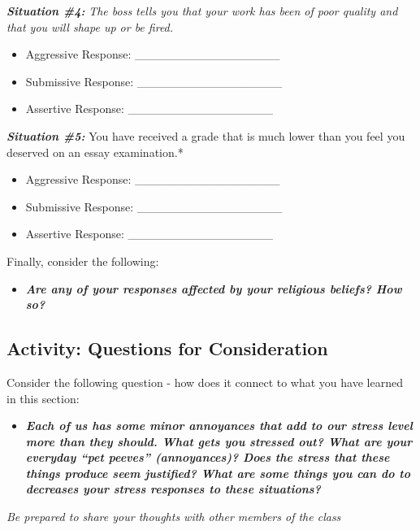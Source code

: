 \documentclass[
]{book}
\providecommand{\tightlist}{%
  \setlength{\itemsep}{0pt}\setlength{\parskip}{0pt}}
\begin{document}
\begin{reflect}
\textbf{\emph{Situation \#4:}} \emph{The boss tells you that your work has been of poor quality and that you will shape up or be fired.}

\begin{itemize}
\tightlist
\item
  Aggressive Response: \_\_\_\_\_\_\_\_\_\_\_\_\_\_\_\_\_\\
\item
  Submissive Response: \_\_\_\_\_\_\_\_\_\_\_\_\_\_\_\_\_\\
\item
  Assertive Response: \_\_\_\_\_\_\_\_\_\_\_\_\_\_\_\_\_
\end{itemize}

\textbf{\emph{Situation \#5:}} You have received a grade that is much lower than you feel you deserved on an essay examination.*

\begin{itemize}
\tightlist
\item
  Aggressive Response: \_\_\_\_\_\_\_\_\_\_\_\_\_\_\_\_\_\\
\item
  Submissive Response: \_\_\_\_\_\_\_\_\_\_\_\_\_\_\_\_\_\\
\item
  Assertive Response: \_\_\_\_\_\_\_\_\_\_\_\_\_\_\_\_\_
\end{itemize}

Finally, consider the following:

\begin{itemize}
\tightlist
\item
  \textbf{\emph{Are any of your responses affected by your religious beliefs? How so?}}
\end{itemize}
\end{reflect}

\hypertarget{activity-questions-for-consideration-13}{%
\subsection*{Activity: Questions for Consideration}\label{activity-questions-for-consideration-13}}

\begin{reflect}
Consider the following question - how does it connect to what you have learned in this section:

\begin{itemize}
\tightlist
\item
  \textbf{\emph{Each of us has some minor annoyances that add to our stress level more than they should. What gets you stressed out? What are your everyday ``pet peeves'' (annoyances)? Does the stress that these things produce seem justified? What are some things you can do to decreases your stress responses to these situations?}}
\end{itemize}

\emph{Be prepared to share your thoughts with other members of the class}
\end{reflect}
\end{document}
